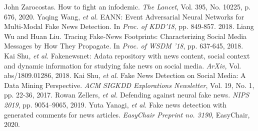 {	\vspace*{1mm}
	{\footnotesize 
	\begin{thebibliography}{99}
		\vspace*{-2mm}
		\setlength{\parskip}{0cm}
		\setlength{\itemsep}{0cm}
		\begin{spacing}{0.7}
		 John Zarocostas. How to fight an infodemic. \textit{The Lancet}, Vol. 395, No. 10225, p. 676, 2020.
		 Yaqing Wang, \textit{et al.} EANN: Event Adversarial Neural Networks for Multi-Modal Fake News Detection. In \textit{Proc. of KDD'18}, pp. 849-857. 2018.
		 Liang Wu and Huan Liu. Tracing Fake-News Footprints: Characterizing Social Media Messages by How They Propagate. In \textit{Proc. of WSDM '18},  pp. 637-645, 2018.
		 Kai Shu, \textit{et al.} Fakenewsnet: Adata repository with news content, social context and dynamic information for studying fake news on social media. \textit{ArXiv}, Vol. abs/1809.01286, 2018.
		 Kai Shu, \textit{et al.} Fake News Detection on Social Media: A Data Mining Perspective. \textit{ACM SIGKDD Explorations Newsletter}, Vol. 19, No. 1, pp. 22-36, 2017.
		 Rowan Zellers, \textit{et al.} Defending against neural fake news. \textit{NIPS 2019}, pp. 9054–9065, 2019.
		 Yuta Yanagi, \textit{et al.} Fake news detection with generated comments for news articles. \textit{EasyChair Preprint no. 3190}, EasyChair, 2020.
		\end{spacing}
	\end{thebibliography}
	}
}

